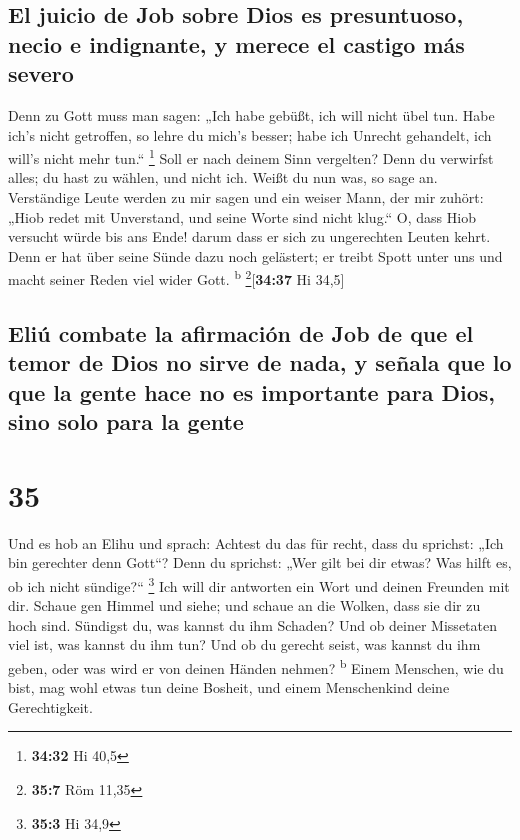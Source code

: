 \hypertarget{el-juicio-de-job-sobre-dios-es-presuntuoso-necio-e-indignante-y-merece-el-castigo-muxe1s-severo}{%
\subsection{El juicio de Job sobre Dios es presuntuoso, necio e
indignante, y merece el castigo más
severo}\label{el-juicio-de-job-sobre-dios-es-presuntuoso-necio-e-indignante-y-merece-el-castigo-muxe1s-severo}}

 Denn zu Gott muss man sagen: „Ich habe gebüßt, ich will
nicht übel tun.  Habe ich's nicht getroffen, so lehre du
mich's besser; habe ich Unrecht gehandelt, ich will's nicht mehr tun.``
\footnote{\textbf{34:32} Hi 40,5}  Soll er nach deinem
Sinn vergelten? Denn du verwirfst alles; du hast zu wählen, und nicht
ich. Weißt du nun was, so sage an.  Verständige Leute
werden zu mir sagen und ein weiser Mann, der mir zuhört: 
„Hiob redet mit Unverstand, und seine Worte sind nicht klug.``
 O, dass Hiob versucht würde bis ans Ende! darum dass er
sich zu ungerechten Leuten kehrt.  Denn er hat über seine
Sünde dazu noch gelästert; er treibt Spott unter uns und macht seiner
Reden viel wider Gott. \textsuperscript{b} \footnote{\textbf{35:7} Röm
  11,35}{[}\textbf{34:37} Hi 34,5{]}

\hypertarget{eliuxfa-combate-la-afirmaciuxf3n-de-job-de-que-el-temor-de-dios-no-sirve-de-nada-y-seuxf1ala-que-lo-que-la-gente-hace-no-es-importante-para-dios-sino-solo-para-la-gente}{%
\subsection{Eliú combate la afirmación de Job de que el temor de Dios no
sirve de nada, y señala que lo que la gente hace no es importante para
Dios, sino solo para la
gente}\label{eliuxfa-combate-la-afirmaciuxf3n-de-job-de-que-el-temor-de-dios-no-sirve-de-nada-y-seuxf1ala-que-lo-que-la-gente-hace-no-es-importante-para-dios-sino-solo-para-la-gente}}

\hypertarget{section-34}{%
\section{35}\label{section-34}}

 Und es hob an Elihu und sprach:  Achtest du
das für recht, dass du sprichst: „Ich bin gerechter denn Gott``?
 Denn du sprichst: „Wer gilt bei dir etwas? Was hilft es,
ob ich nicht sündige?{}`` \footnote{\textbf{35:3} Hi 34,9}
 Ich will dir antworten ein Wort und deinen Freunden mit
dir.  Schaue gen Himmel und siehe; und schaue an die
Wolken, dass sie dir zu hoch sind.  Sündigst du, was
kannst du ihm Schaden? Und ob deiner Missetaten viel ist, was kannst du
ihm tun?  Und ob du gerecht seist, was kannst du ihm
geben, oder was wird er von deinen Händen nehmen? \textsuperscript{b}
 Einem Menschen, wie du bist, mag wohl etwas tun deine
Bosheit, und einem Menschenkind deine Gerechtigkeit.

